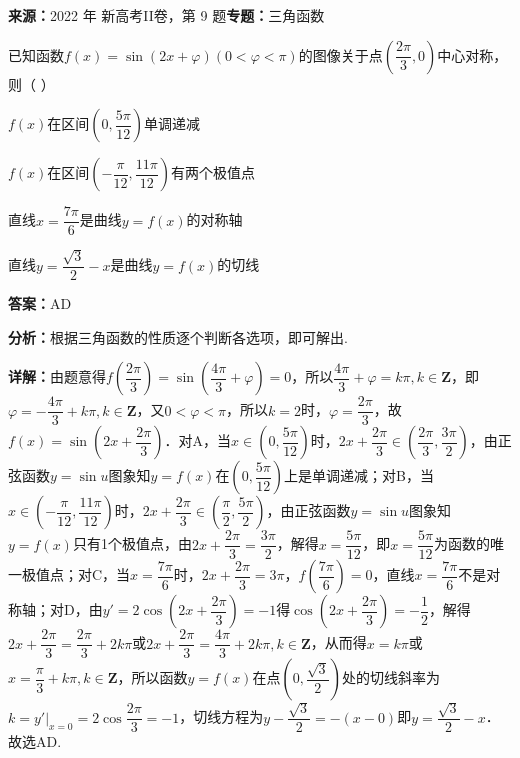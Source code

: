 \begin{question}[points=5]
\textbf{来源：}2022 年 新高考II卷，第 9 题\quad \textbf{专题：}三角函数\par
已知函数$f(x)=\sin(2x+\varphi)(0<\varphi<\pi)$的图像关于点$\left(\dfrac{2\pi}{3},0\right)$中心对称，则（ ）
\begin{choices}
  \item $f(x)$在区间$\left(0,\dfrac{5\pi}{12}\right)$单调递减
  \item $f(x)$在区间$\left(-\dfrac{\pi}{12},\dfrac{11\pi}{12}\right)$有两个极值点
  \item 直线$x=\dfrac{7\pi}{6}$是曲线$y=f(x)$的对称轴
  \item 直线$y=\dfrac{\sqrt{3}}{2}-x$是曲线$y=f(x)$的切线
\end{choices}
\begin{solution}
\textbf{答案：}AD

\textbf{分析：}根据三角函数的性质逐个判断各选项，即可解出.

\textbf{详解：}由题意得$f\left(\dfrac{2\pi}{3}\right)=\sin\left(\dfrac{4\pi}{3}+\varphi\right)=0$，所以$\dfrac{4\pi}{3}+\varphi=k\pi,k\in\mathbf{Z}$，即$\varphi=-\dfrac{4\pi}{3}+k\pi,k\in\mathbf{Z}$，又$0<\varphi<\pi$，所以$k=2$时，$\varphi=\dfrac{2\pi}{3}$，故$f(x)=\sin\left(2x+\dfrac{2\pi}{3}\right)$．对A，当$x\in\left(0,\dfrac{5\pi}{12}\right)$时，$2x+\dfrac{2\pi}{3}\in\left(\dfrac{2\pi}{3},\dfrac{3\pi}{2}\right)$，由正弦函数$y=\sin u$图象知$y=f(x)$在$\left(0,\dfrac{5\pi}{12}\right)$上是单调递减；对B，当$x\in\left(-\dfrac{\pi}{12},\dfrac{11\pi}{12}\right)$时，$2x+\dfrac{2\pi}{3}\in\left(\dfrac{\pi}{2},\dfrac{5\pi}{2}\right)$，由正弦函数$y=\sin u$图象知$y=f(x)$只有1个极值点，由$2x+\dfrac{2\pi}{3}=\dfrac{3\pi}{2}$，解得$x=\dfrac{5\pi}{12}$，即$x=\dfrac{5\pi}{12}$为函数的唯一极值点；对C，当$x=\dfrac{7\pi}{6}$时，$2x+\dfrac{2\pi}{3}=3\pi$，$f\left(\dfrac{7\pi}{6}\right)=0$，直线$x=\dfrac{7\pi}{6}$不是对称轴；对D，由$y'=2\cos\left(2x+\dfrac{2\pi}{3}\right)=-1$得$\cos\left(2x+\dfrac{2\pi}{3}\right)=-\dfrac{1}{2}$，解得$2x+\dfrac{2\pi}{3}=\dfrac{2\pi}{3}+2k\pi$或$2x+\dfrac{2\pi}{3}=\dfrac{4\pi}{3}+2k\pi,k\in\mathbf{Z}$，从而得$x=k\pi$或$x=\dfrac{\pi}{3}+k\pi,k\in\mathbf{Z}$，所以函数$y=f(x)$在点$\left(0,\dfrac{\sqrt{3}}{2}\right)$处的切线斜率为$k=y'|_{x=0}=2\cos\dfrac{2\pi}{3}=-1$，切线方程为$y-\dfrac{\sqrt{3}}{2}=-(x-0)$即$y=\dfrac{\sqrt{3}}{2}-x$．故选AD.
\end{solution}
\end{question}


